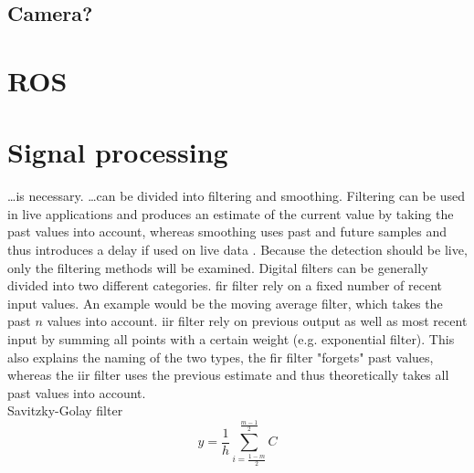 \subsection{Camera?}



\section{ROS}



\section{Signal processing}
\dots is necessary.
\dots can be divided into filtering and smoothing.
Filtering can be used in live applications and produces an estimate of the current value by taking the past values into account, whereas smoothing uses past and future samples and thus introduces a delay if used on live data .
Because the detection should be live, only the filtering methods will be examined.
Digital filters can be generally divided into two different categories.
\gls{fir} filter rely on a fixed number of recent input values. An example would be the moving average filter, which takes the past $n$ values into account.
\gls{iir} filter rely on previous output as well as most recent input by summing all points with a certain weight (e.g. exponential filter).
This also explains the naming of the two types, the \gls{fir} filter "forgets" past values, whereas the \gls{iir} filter uses the previous estimate and thus theoretically takes all past values into account.\\
Savitzky-Golay filter
\begin{equation}
	y = \frac{1}{h}\sum_{i =\frac{1 - m}{2}}^{\frac{m - 1}{2}}C
\end{equation}